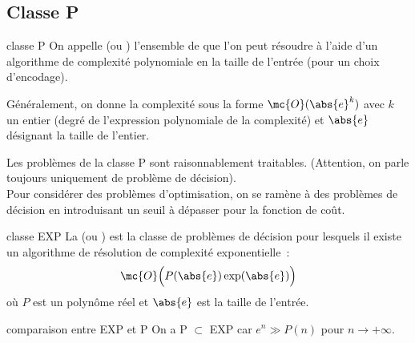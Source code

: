 \subsection{Classe P}

\begin{definition}{}{classe P}
    On appelle  (ou ) l'ensemble de  que l'on peut résoudre à l'aide d'un algorithme de complexité polynomiale en la taille de l'entrée (pour un choix d'encodage).
\end{definition}

\begin{remarque}{}{}
    Généralement, on donne la complexité sous la forme $\mc{O}(\abs{e}^k)$ avec $k$ un entier (degré de l'expression polynomiale de la complexité) et $\abs{e}$ désignant la taille de l'entier.
\end{remarque}

\begin{remarque}{}{}
    Les problèmes de la classe P sont raisonnablement traitables. (Attention, on parle toujours uniquement de problème de décision).\\
    Pour considérer des problèmes d'optimisation, on se ramène à des problèmes de décision en introduisant un seuil à dépasser pour la fonction de coût.
\end{remarque}

\begin{remarque}{}{classe EXP}
    La  (ou ) est la classe de problèmes de décision pour lesquels il existe un algorithme de résolution de complexité exponentielle~:
    $$\mc{O}\Big(P(\abs{e})\exp(\abs{e})\Big)$$
    où $P$ est un polynôme réel et $\abs{e}$ est la taille de l'entrée.
\end{remarque}

\begin{remarque}{}{comparaison entre EXP et P}
    On a P $\subset$ EXP car $e^n \gg P(n)$ pour $n \to +\infty$.
\end{remarque}

